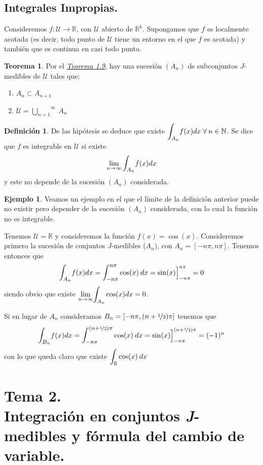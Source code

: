 \documentclass[12pt,twoside]{report}
\newcommand\mc[1]{\mathcal{#1}}
\theoremstyle{azul}
\theoremstyle{azul2}
\theoremstyle{plain}
\theoremstyle{definition}
\newtheorem{eje}{Ejemplo}[chapter]
\newtheorem{defin}{Definición}[chapter]
\newtheorem{teo}{Teorema}[chapter]
\theoremstyle{remark}
\begin{document}
\section{Integrales Impropias.}
Consideremos $f: \mc{U} \longrightarrow \mathbb{R}$, con $\mc{U}$ abierto de $\mathbb{R}^k$. Supongamos que $f$ es localmente acotada (es decir, todo punto de $\mc{U}$ tiene un entorno en el que $f$ es acotada) y también que es continua en casi todo punto.
\begin{teo}
Por el \hyperref[teo1.9.]{\textit{Teorema 1.9}}, hay una sucesión $(A_n)$ de subconjuntos $J$-medibles de $\mc{U}$ tales que:
\begin{enumerate}[1)]
    \item $A_n \subset A_{n+1}$
    \item $\mc{U}=\overset{\infty}{\underset{n=1}{\bigcup}} \: A_n$
\end{enumerate}
\end{teo}
\begin{defin}
De las hipótesis se deduce que existe $\mathlarger{\int_{A_n}} f(x) dx \; \forall \: n \in \mathbb{N}$. Se dice que $f$ es integrable en $\mc{U}$ si existe
$$\lim_{n \to \infty}\mathlarger{\int_{A_n}} f(x) dx$$ 
y este no depende de la sucesión $(A_n)$ considerada.
\end{defin}
\begin{eje}
Veamos un ejemplo en el que el límite de la definición anterior puede no existir pero depender de la sucesión $(A_n)$ considerada, con lo cual la función no es integrable.

Tenemos $\mc{U}=\mathbb{R}$ y consideremos la función $f(x)=\cos (x)$. Consideremos primero la sucesión de conjuntos $J$-medibles ($A_n$), con $A_n=[-n \pi, n \pi]$. Tenemos entonces que $$\mathlarger{\int_{A_n}} f(x) dx = \mathlarger{\int_{-n \pi}^{n \pi}} \cos (x) \:  dx=\sin (x) \Big]_{-n \pi}^{n \pi} = 0$$
siendo obvio que existe $\underset{n \to \infty}{\lim}\mathlarger{\int_{A_n}} \cos(x) dx = 0$.

Si en lugar de $A_n$ consideramos $B_n=[-n \pi, (n+\nicefrac{1}{2}) \pi]$ tenemos que 
$$\mathlarger{\int_{B_n}} f(x) dx = \mathlarger{\int_{-n \pi}^{(n+\nicefrac{1}{2}) \pi}} \cos ( x )\:  dx=\sin  (x) \Big]_{-n \pi}^{(n+\nicefrac{1}{2}) \pi} = (-1)^n$$
con lo que queda claro que existe $\mathlarger{\int_{\mathbb{R}}} \cos (x) \:  dx $
\end{eje}
\chapter{Tema 2. \\ Integración en conjuntos \textit{J}-medibles y fórmula del cambio de variable.}
\end{document}
